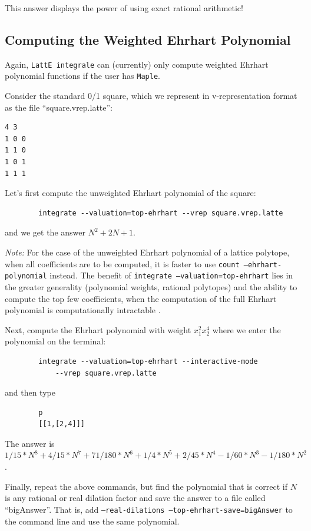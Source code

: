 \documentclass{article}
\newcommand{\latteInt}{{\tt LattE integrale}\xspace}
\newcommand{\maple}{{\tt Maple}\xspace}
\begin{document}
This answer displays the power of using exact rational arithmetic!      



\subsection{Computing the Weighted Ehrhart Polynomial}

Again, \latteInt can (currently) only compute weighted Ehrhart polynomial
functions 
if 
the user has \maple.

Consider the standard 0/1 square, which we represent in v-representation format as the
file ``square.vrep.latte'':
\begin{verbatim}
4 3
1 0 0
1 1 0
1 0 1
1 1 1
\end{verbatim}
Let's first compute the unweighted Ehrhart polynomial of the square:
        \begin{verbatim}
        integrate --valuation=top-ehrhart --vrep square.vrep.latte 
        \end{verbatim}
and we get the answer $N^2 + 2N + 1$. 

\emph{Note:} For the case of the unweighted Ehrhart polynomial of a lattice polytope,
when all coefficients are to be computed, it is faster to use \texttt{count
  --ehrhart-polynomial} instead.  The benefit of \texttt{integrate
  --valuation=top-ehrhart} lies in the greater generality (polynomial weights,
rational polytopes) and the ability to compute the top few coefficients, when
the computation of the full Ehrhart polynomial is computationally intractable
\cite{so-called-paper-1}. 


Next, compute the Ehrhart polynomial with weight $x_1^2x_2^4$ where we enter
the polynomial on the terminal:
        \begin{verbatim}
        integrate --valuation=top-ehrhart --interactive-mode 
            --vrep square.vrep.latte 
        \end{verbatim}
and then type
        \begin{verbatim}
        p
        [[1,[2,4]]]
        \end{verbatim}
The answer is $1/15*N^8+4/15*N^7+71/180*N^6+1/4*N^5+2/45*N^4-1/60*N^3-1/180*N^2$.

Finally, repeat the above commands, but find the polynomial that is correct if
$N$ is any rational or real dilation factor and save the answer to a file called
``bigAnswer''. That is, add \texttt{--real-dilations
  --top-ehrhart-save=bigAnswer} to the command line and use the same
polynomial.  
\end{document}
